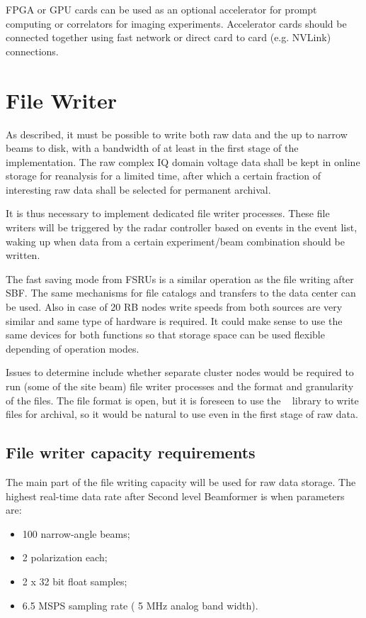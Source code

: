 \documentclass[12pt,a4paper]{article}
\begin{document}
FPGA or GPU cards can be used as an optional accelerator for prompt computing or correlators for imaging experiments. 
Accelerator cards should be connected together using fast network or direct card to card (e.g. NVLink) connections.
\fi

\section{File Writer}
\label{sec:filewriter}

As described, it must be possible to write both raw \RB data and the up to \NNB narrow beams to disk, with a bandwidth of at least \NBW in the first stage of the \ED implementation. 
 The raw complex IQ domain voltage data shall be kept in online storage for reanalysis for a limited time, after which a certain fraction of interesting raw data shall be selected for permanent archival.  
 
 It is thus necessary to implement dedicated file writer processes. These file writers will be triggered by the radar controller based on events in the event list, waking up when data from a certain experiment/beam combination should be written. 

The fast saving mode from FSRUs is a similar operation as the file writing after SBF. 
The same mechanisms for file catalogs and transfers to the data center can be used. 
Also in case of 20 RB nodes write speeds from both sources are very similar and same type of hardware is required. 
It could make sense to use the same devices for both functions so that storage space can be used flexible depending of operation modes. 

Issues to determine include whether separate cluster nodes would be required to run (some of the site beam) file writer processes and the format and granularity of the files. 
The file format is open, but it is foreseen to use the \HDF~\cite{hdf} library to write files for archival, so it would be natural to use \HDF even in the first stage of raw data.


\subsection{File writer capacity requirements}
The main part of the file writing capacity will be used for raw data storage. The highest real-time data rate after Second level Beamformer is when parameters are:
\begin{itemize}
\item 100 narrow-angle beams;
\item 2 polarization each;
\item 2 x 32 bit float samples; %
\item 6.5 MSPS sampling rate ( 5 MHz analog band width).
\end{itemize}
\end{document}
